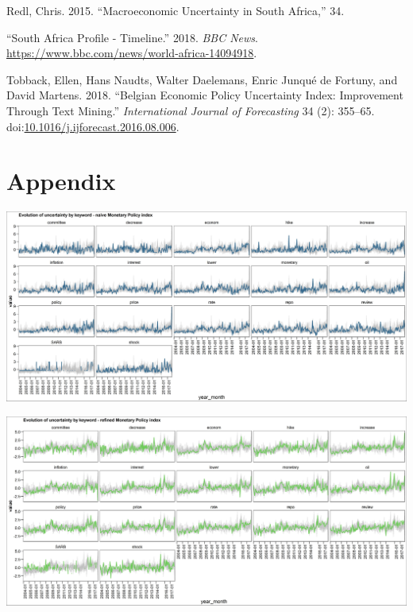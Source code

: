 \documentclass[11pt,preprint, authoryear]{elsarticle}
\let\origfigure\figure
\let\endorigfigure\endfigure
\renewenvironment{figure}[1][2] {
    \expandafter\origfigure\expandafter[H]
} {
    \endorigfigure
}
\numberwithin{equation}{section}
\numberwithin{figure}{section}
\numberwithin{table}{section}
\begin{document}
\hypertarget{ref-Redl2015}{}
Redl, Chris. 2015. ``Macroeconomic Uncertainty in South Africa,'' 34.

\hypertarget{ref-2018}{}
``South Africa Profile - Timeline.'' 2018. \emph{BBC News}.
\url{https://www.bbc.com/news/world-africa-14094918}.

\hypertarget{ref-Tobback2018}{}
Tobback, Ellen, Hans Naudts, Walter Daelemans, Enric Junqué de Fortuny,
and David Martens. 2018. ``Belgian Economic Policy Uncertainty Index:
Improvement Through Text Mining.'' \emph{International Journal of
Forecasting} 34 (2): 355--65.
doi:\href{https://doi.org/10.1016/j.ijforecast.2016.08.006}{10.1016/j.ijforecast.2016.08.006}.

\newpage

\section*{\texorpdfstring{Appendix
		\label{sec_appendix}}{Results }}\label{appendix}
\begin{figure}
	\centering
	\includegraphics[width=\linewidth, keepaspectratio]{bin/monetary_key_naive}\\
	
	\caption{Composite Monetary Policy uncertainty naive index. \label{fig_mon_key_n}}
\end{figure}

\begin{figure}
	\centering
	\includegraphics[width=\linewidth, keepaspectratio]{bin/monetary_key_refine}\\
	
	\caption{Composite Monetary Policy uncertainty refined index. \label{fig_mon_key_r}}
\end{figure}
\end{document}

